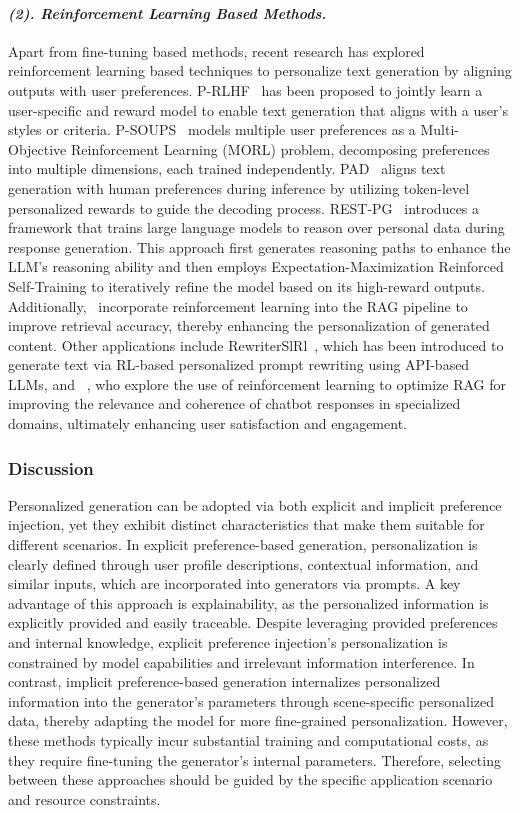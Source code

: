 \paragraph{\textbf{\textit{{(2). Reinforcement Learning Based Methods.}}}}
Apart from fine-tuning based methods, recent research has explored reinforcement learning based techniques to personalize text generation by aligning outputs with user preferences. P-RLHF~\cite{li2024personalized} has been proposed to jointly learn a user-specific and reward model to enable text generation that aligns with a user's styles or criteria. P-SOUPS~\cite{jang2023personalized} models multiple user preferences as a Multi-Objective Reinforcement Learning (MORL) problem, decomposing preferences into multiple dimensions, each trained independently. PAD~\cite{chen2024pad} aligns text generation with human preferences during inference by utilizing token-level personalized rewards to guide the decoding process. REST-PG~\cite{salemi2025reasoning} introduces a framework that trains large language models to reason over personal data during response generation. This approach first generates reasoning paths to enhance the LLM's reasoning ability and then employs Expectation-Maximization Reinforced Self-Training to iteratively refine the model based on its high-reward outputs. Additionally,~\citet{salemi2024optimization} incorporate reinforcement learning into the RAG pipeline to improve retrieval accuracy, thereby enhancing the personalization of generated content. Other applications include RewriterSlRl~\cite{li2024learning}, which has been introduced to generate text via RL-based personalized prompt rewriting using API-based LLMs, and ~\citet{kulkarni2024reinforcement}, who explore the use of reinforcement learning to optimize RAG for improving the relevance and coherence of chatbot responses in specialized domains, ultimately enhancing user satisfaction and engagement.

\subsubsection{\textbf{Discussion}}
Personalized generation can be adopted via both explicit and implicit preference injection, yet they exhibit distinct characteristics that make them suitable for different scenarios.
In explicit preference-based generation, personalization is clearly defined through user profile descriptions, contextual information, and similar inputs, which are incorporated into generators via prompts. A key advantage of this approach is explainability, as the personalized information is explicitly provided and easily traceable. 
Despite leveraging provided preferences and internal knowledge, explicit preference injection's personalization is constrained by model capabilities and irrelevant information interference.
In contrast, implicit preference-based generation internalizes personalized information into the generator's parameters through scene-specific personalized data, thereby adapting the model for more fine-grained personalization. However, these methods typically incur substantial training and computational costs, as they require fine-tuning the generator’s internal parameters. Therefore, selecting between these approaches should be guided by the specific application scenario and resource constraints.
